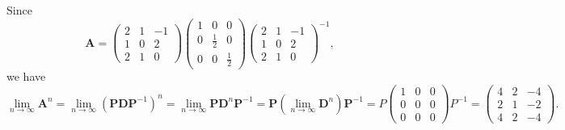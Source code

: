 \documentclass{article}
\begin{document}
\begin{enumerate}[(a)]
    Since $$\textbf{A}=\begin{pmatrix}2&1&-1\\1&0&2\\2&1&0\end{pmatrix}\begin{pmatrix}1&0&0\\0&\frac{1}{2}&0\\0&0&\frac{1}{2}\end{pmatrix}\begin{pmatrix}2&1&-1\\1&0&2\\2&1&0\end{pmatrix}^{-1},$$ we have
    $$\lim_{n\to\infty}\textbf{A}^n=\lim_{n\to\infty}(\textbf{PDP}^{-1})^n=\lim_{n\to\infty}\textbf{P}\textbf{D}^n\textbf{P}^{-1}=\textbf{P}\left(\lim_{n\to\infty}\textbf{D}^n\right)\textbf{P}^{-1}=P\begin{pmatrix}1&0&0\\0&0&0\\0&0&0\end{pmatrix}P^{-1}=\begin{pmatrix}4&2&-4\\2&1&-2\\4&2&-4\end{pmatrix}.$$
\end{enumerate}
\end{document}
